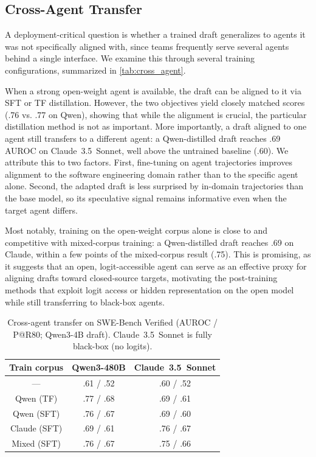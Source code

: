 \documentclass[11pt]{article}
\newcommand{\Hnumber}[1]{#1}
\begin{document}
\subsection{Cross-Agent Transfer}
\label{sec:cross_agent}

A deployment-critical question is whether a trained draft generalizes to agents
it was not specifically aligned with, since teams frequently serve several
agents behind a single interface. We examine this through several training
configurations, summarized in \autoref{tab:cross_agent}.

When a strong open-weight agent is available, the draft can be aligned to it via
SFT or TF distillation. However, the two
objectives yield closely matched scores (\Hnumber{.76} vs. \Hnumber{.77} on Qwen),
showing that while the alignment is crucial, the particular
distillation method is not as important. More importantly, a draft aligned to one agent still
transfers to a different agent: a Qwen-distilled draft reaches
\Hnumber{.69} AUROC on Claude~3.5~Sonnet, well above the untrained baseline
(\Hnumber{.60}). We attribute this to two factors. First, fine-tuning on agent
trajectories improves alignment to the software engineering domain rather than
to the specific agent alone. Second, the adapted draft is less surprised by
in-domain trajectories than the base model, so its speculative signal remains
informative even when the target agent differs.

Most notably, training on the open-weight corpus alone is close to and
competitive with mixed-corpus training: a Qwen-distilled draft reaches
\Hnumber{.69} on Claude, within a few points of the mixed-corpus result
(\Hnumber{.75}). This is promising, as it suggests that an open, logit-accessible
agent can serve as an effective proxy for aligning drafts toward closed-source
targets, motivating the post-training methods that exploit logit access or hidden representation on
the open model while still transferring to black-box agents.

\begin{table}[t]
\centering
\caption{Cross-agent transfer on SWE-Bench Verified (AUROC / P@R80; Qwen3-4B draft). 
Claude~3.5~Sonnet is fully black-box (no logits).}
\label{tab:cross_agent}
\small
\setlength{\tabcolsep}{5pt}
\renewcommand{\arraystretch}{1.1}
\begin{tabular}{@{}ccc@{}}
\toprule
\textbf{Train corpus}
  & \textbf{Qwen3-480B} & \textbf{Claude~3.5~Sonnet} \\
\midrule
---        & \Hnumber{.61} / \Hnumber{.52} & \Hnumber{.60} / \Hnumber{.52} \\
Qwen (TF)   & \Hnumber{.77} / \Hnumber{.68} & \Hnumber{.69} / \Hnumber{.61} \\
Qwen (SFT)   & \Hnumber{.76} / \Hnumber{.67} & \Hnumber{.69} / \Hnumber{.60} \\
Claude (SFT) & \Hnumber{.69} / \Hnumber{.61} & \Hnumber{.76} / \Hnumber{.67} \\
Mixed (SFT)  & \Hnumber{.76} / \Hnumber{.67} & \Hnumber{.75} / \Hnumber{.66} \\
\bottomrule
\end{tabular}
\end{table}
\end{document}
